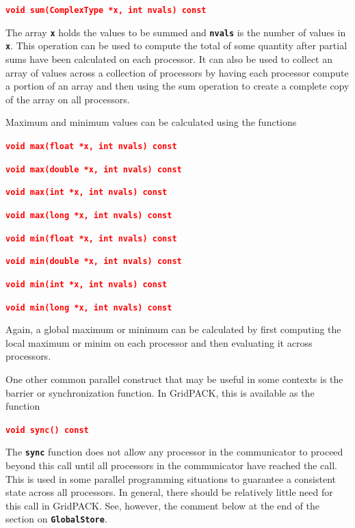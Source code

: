 \documentclass[12pt]{report} %
\begin{document}
\textcolor{red}{\texttt{\textbf{void sum(ComplexType *x, int nvals) const}}}

The array \texttt{\textbf{x}} holds the values to be summed and \texttt{\textbf{nvals}} is the number of values in \texttt{\textbf{x}}. This operation can be used to compute the total of some quantity after partial sums have been calculated on each processor. It can also be used to collect an array of values across a collection of processors by having each processor compute a portion of an array and then using the sum operation to create a complete copy of the array on all processors.

Maximum and minimum values can be calculated using the functions

\textcolor{red}{\texttt{\textbf{void max(float *x, int nvals) const}}}

\textcolor{red}{\texttt{\textbf{void max(double *x, int nvals) const}}}

\textcolor{red}{\texttt{\textbf{void max(int *x, int nvals) const}}}

\textcolor{red}{\texttt{\textbf{void max(long *x, int nvals) const}}}

\textcolor{red}{\texttt{\textbf{}}}

\textcolor{red}{\texttt{\textbf{void min(float *x, int nvals) const}}}

\textcolor{red}{\texttt{\textbf{void min(double *x, int nvals) const}}}

\textcolor{red}{\texttt{\textbf{void min(int *x, int nvals) const}}}

\textcolor{red}{\texttt{\textbf{void min(long *x, int nvals) const}}}

Again, a global maximum or minimum can be calculated by first computing the local maximum or minim on each processor and then evaluating it across processors. 

One other common parallel construct that may be useful in some contexts is the barrier or synchronization function. In GridPACK, this is available as the function

\textcolor{red}{\texttt{\textbf{void sync() const}}}

The \texttt{\textbf{sync}} function does not allow any processor in the communicator to proceed beyond this call until all processors in the communicator have reached the call. This is used in some parallel programming situations to guarantee a consistent state across all processors.  In general, there should be relatively little need for this call in GridPACK. See, however, the comment below at the end of the section on \texttt{\textbf{GlobalStore}}.
\end{document}
